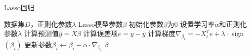 \documentclass{article}
\begin{document}
	
	\begin{algorithm}
		\caption{Lasso回归}
		\begin{algorithmic}[1]
			\Require 数据集$D$，正则化参数$\lambda$
			\Ensure Lasso模型参数$\beta$
			\State 初始化参数$\beta$为0
			\State 设置学习率$\alpha$和正则化参数$\lambda$
			\State 计算预测值$\hat{y} = X\beta$
			\State 计算误差项$e = y - \hat{y}$
			\State 计算梯度$\nabla_{\beta_i} = -X_i^T e + \lambda \cdot $ sign $(\beta_i)$
			\State 更新参数$\beta_i \leftarrow \beta_i - \alpha \cdot \nabla_{\beta_i}$
			\EndFor
			\EndWhile
			\State \Return $\beta$
		\end{algorithmic}
	\end{algorithm}
	
\end{document}
